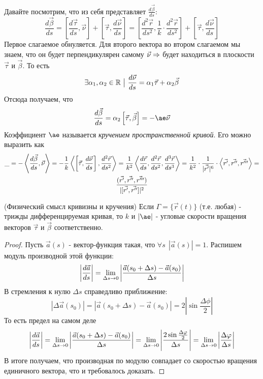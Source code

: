 \begin{definition}
	Давайте посмотрим, что из себя представляет $\frac{d\vec{\beta}}{ds}$:
	\[
		\frac{d\vec{\beta}}{ds} = \left[\frac{d\vec{\tau}}{ds}, \vec{\nu}\right] + \left[\vec{\tau}, \frac{d\vec{\nu}}{ds}\right] = \left[\frac{d^2\vec{r}}{ds^2}, \frac{1}{k} \cdot \frac{d^2\vec{r}}{ds^2}\right] + \left[\vec{\tau}, \frac{d\vec{\nu}}{ds}\right]
	\]
	Первое слагаемое обнуляется. Для второго вектора во втором слагаемом мы знаем, что он будет перпендикулярен самому $\vec{\nu} \Rightarrow $ будет находиться в плоскости $\vec{\tau}$ и $\vec{\beta}$. То есть
	\[
		\exists \alpha_1, \alpha_2 \in \mathbb{R} \ \big|\  \frac{d\vec{\nu}}{ds} = \alpha_1 \vec{\tau} + \alpha_2 \vec{\beta}
	\]
	Отсюда получаем, что
	\[
		\frac{d\vec{\beta}}{ds} = \alpha_2\left[\vec{\tau}, \vec{\beta}\right] = -\ae \vec{\nu}
	\]
	Коэффициент $\ae$ называется \textit{кручением пространственной кривой}. Его можно выразить как
	\begin{multline*}
		\ae = -\trbr{\frac{d\vec{\beta}}{ds}, \vec{\nu}} = -\frac{1}{k} \trbr{\left[\vec{\tau}, \frac{d\vec{\nu}}{ds}\right], \frac{d^2\vec{r}}{ds^2}} = \frac{1}{k^2} \trbr{\frac{d\vec{r}}{ds}, \frac{d^2\vec{r}}{ds^2}, \frac{d^3\vec{r}}{ds^3}} = \frac{1}{k^2} \cdot \frac{1}{|\vec{r'}|^6} \cdot \trbr{\vec{r'}, \vec{r''}, \vec{r'''}} =
		\\
		\frac{(\vec{r'}, \vec{r''}, \vec{r'''})}{|[\vec{r'}, \vec{r''}]|^2}
	\end{multline*}
\end{definition}

\begin{lemma} (Физический смысл кривизны и кручения)
	Если $\Gamma = \{\vec{r}(t)\}$ (т.е. любая) - трижды дифференцируемая кривая, то $k$ и $|\ae|$ - угловые скорости вращения векторов $\vec{\tau}$ и $\vec{\beta}$ соответственно.
\end{lemma}

\begin{proof}
	Пусть $\vec{a}(s)$ - вектор-функция такая, что $\forall s\ \ |\vec{a}(s)| = 1$. Распишем модуль производной этой функции:
	\[
		\left|\frac{d\vec{a}}{ds}\right| = \lim\limits_{\Delta s \to 0} \left|\frac{\vec{a}(s_0 + \Delta s) - \vec{a}(s_0)}{\Delta s}\right|
	\]
	В стремления к нулю $\Delta s$ справедливо приближение:
	\[
		|\Delta \vec{a}(s_0)| = |\vec{a}(s_0 + \Delta s) - \vec{a}(s_0)| = 2\left|\sin \frac{\Delta \phi}{2}\right|
	\]
	То есть предел на самом деле
	\[
		\left|\frac{d\vec{a}}{ds}\right| = \lim\limits_{\Delta s \to 0} \left|\frac{\vec{a}(s_0 + \Delta s) - \vec{a}(s_0)}{\Delta s}\right| = \lim\limits_{\Delta s \to 0} \left|\frac{2\sin \frac{\Delta \varphi}{2}}{\Delta s}\right| = \lim\limits_{\Delta s \to 0} \left|\frac{\Delta \varphi}{\Delta s}\right|
	\]
	В итоге получаем, что производная по модулю совпадает со скоростью вращения единичного вектора, что и требовалось доказать.
\end{proof}

